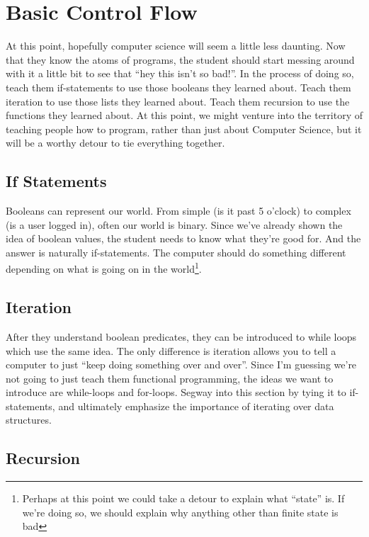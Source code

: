 \documentclass[12pt]{article}
\begin{document}
    \section{Basic Control Flow}

      At this point, hopefully computer science will seem a little less daunting. Now that they know the atoms of programs, the student should start messing around with it a little bit to see that ``hey this isn't so bad!''. In the process of doing so, teach them if-statements to use those booleans they learned about. Teach them iteration to use those lists they learned about. Teach them recursion to use the functions they learned about. At this point, we might venture into the territory of teaching people how to program, rather than just about Computer Science, but it will be a worthy detour to tie everything together.  

      \subsection{If Statements}

        Booleans can represent our world. From simple (is it past 5 o'clock) to complex (is a user logged in), often our world is binary. Since we've already shown the idea of boolean values, the student needs to know what they're good for. And the answer is naturally if-statements. The computer should do something different depending on what is going on in the world\footnote{Perhaps at this point we could take a detour to explain what ``state'' is. If we're doing so, we should explain why anything other than finite state is bad}.   

      \subsection{Iteration}

        After they understand boolean predicates, they can be introduced to while loops which use the same idea. The only difference is iteration allows you to tell a computer to just ``keep doing something over and over''. Since I'm guessing we're not going to just teach them functional programming, the ideas we want to introduce are while-loops and for-loops. Segway into this section by tying it to if-statements, and ultimately emphasize the importance of iterating over data structures.

      \subsection{Recursion}
\end{document}
